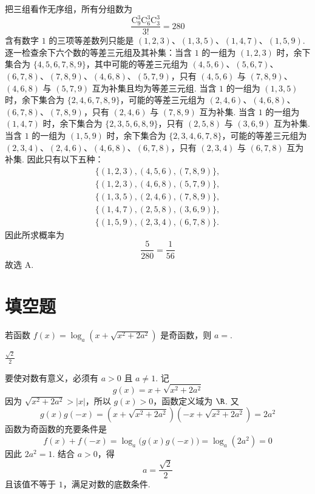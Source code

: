 \begin{solution}
把三组看作无序组，所有分组数为
\[
\frac{\mathrm C_{9}^{3}\mathrm C_{6}^{3}\mathrm C_{3}^{3}}{3!}=280
\]
含有数字 \(1\) 的三项等差数列只能是 \((1,2,3)\)、\((1,3,5)\)、\((1,4,7)\)、\((1,5,9)\). 逐一检查余下六个数的等差三元组及其补集：当含 \(1\) 的一组为 \((1,2,3)\) 时，余下集合为 \(\{4,5,6,7,8,9\}\)，其中可能的等差三元组为 \((4,5,6)\)、\((5,6,7)\)、\((6,7,8)\)、\((7,8,9)\)、\((4,6,8)\)、\((5,7,9)\)，只有 \((4,5,6)\) 与 \((7,8,9)\)、\((4,6,8)\) 与 \((5,7,9)\) 互为补集且均为等差三元组. 当含 \(1\) 的一组为 \((1,3,5)\) 时，余下集合为 \(\{2,4,6,7,8,9\}\)，可能的等差三元组为 \((2,4,6)\)、\((4,6,8)\)、\((6,7,8)\)、\((7,8,9)\)，只有 \((2,4,6)\) 与 \((7,8,9)\) 互为补集. 当含 \(1\) 的一组为 \((1,4,7)\) 时，余下集合为 \(\{2,3,5,6,8,9\}\)，只有 \((2,5,8)\) 与 \((3,6,9)\) 互为补集. 当含 \(1\) 的一组为 \((1,5,9)\) 时，余下集合为 \(\{2,3,4,6,7,8\}\)，可能的等差三元组为 \((2,3,4)\)、\((2,4,6)\)、\((4,6,8)\)、\((6,7,8)\)，只有 \((2,3,4)\) 与 \((6,7,8)\) 互为补集. 因此只有以下五种：
\[
\begin{gathered}
\{(1,2,3),(4,5,6),(7,8,9)\},\\
\{(1,2,3),(4,6,8),(5,7,9)\},\\
\{(1,3,5),(2,4,6),(7,8,9)\},\\
\{(1,4,7),(2,5,8),(3,6,9)\},\\
\{(1,5,9),(2,3,4),(6,7,8)\}.
\end{gathered}
\]
因此所求概率为
\[
\frac5{280}=\frac1{56}
\]
故选 A.
\end{solution}

\section{填空题}
\begin{problem}
若函数 \(f(x)=\log_{a}\left(x+\sqrt{x^{2}+2a^{2}}\right)\) 是奇函数，则 \(a=\)\fillinblank{}.
\end{problem}

\begin{answer}\(\frac{\sqrt{2}}{2}\)\end{answer}

\begin{solution}
要使对数有意义，必须有 \(a>0\) 且 \(a\ne1\). 记
\[
g(x)=x+\sqrt{x^{2}+2a^{2}}
\]
因为 \(\sqrt{x^{2}+2a^{2}}>|x|\)，所以 \(g(x)>0\)，函数定义域为 \(\R\). 又
\[
g(x)g(-x)=\left(x+\sqrt{x^{2}+2a^{2}}\right)
\left(-x+\sqrt{x^{2}+2a^{2}}\right)=2a^{2}
\]
函数为奇函数的充要条件是
\[
f(x)+f(-x)=\log_a\bigl(g(x)g(-x)\bigr)=\log_a(2a^{2})=0
\]
因此 \(2a^{2}=1\). 结合 \(a>0\)，得
\[
a=\frac{\sqrt2}{2}
\]
且该值不等于 \(1\)，满足对数的底数条件.
\end{solution}


